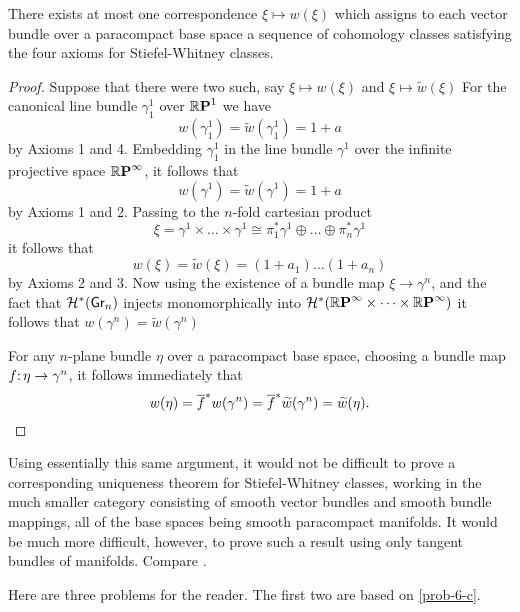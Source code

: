 \begin{theorem}\label{thm-7-3}
	There exists at most one correspondence $\xi \mapsto w(\xi)$ which assigns to each vector bundle over a paracompact base space a sequence of cohomology classes satisfying the four axioms for Stiefel-Whitney classes.
\end{theorem}
\begin{proof}
	Suppose that there were two such, say $\xi \mapsto w(\xi)$ and $\xi \mapsto \widetilde{w}(\xi)$ For the canonical line bundle $\gamma_{1}^{1}$ over $\boldsymbol{\mathbb{R}}\boldsymbol{\mathrm{P}}^{1}$ we have
	\[
	w(\gamma_{1}^{1})=\widetilde{w}(\gamma_{1}^{1})=1+a
	\]
	by Axioms 1 and 4. Embedding $\gamma_{1}^{1}$ in the line bundle $\gamma^{1}$ over the infinite projective space $\boldsymbol{\mathbb{R}}\boldsymbol{\mathrm{P}}^{\infty}$, it follows that
	\[
	w(\gamma^{1})=\widetilde{w}(\gamma^{1})=1+a
	\]
	by Axioms 1 and $2 $. Passing to the $n$-fold cartesian product
	\[
	\xi=\gamma^{1} \times \dots \times \gamma^{1} \cong \pi_{1}^{*} \gamma^{1} \oplus \dots \oplus \pi_{n}^{*} \gamma^{1}
	\]
	it follows that
	\[
	w(\xi)=\widetilde{w}(\xi)=(1+a_{1}) \dots(1+a_{n})
	\]
	by Axioms 2 and 3. Now using the existence of a bundle map $\xi \rightarrow \gamma^{n}$, and the fact that $\homology^{*}(\grass{n}{})$ injects monomorphically into $\mathcal{H}^{*}(\boldsymbol{\mathbb{R}}\boldsymbol{\mathrm{P}}^{\infty} \times \dots \times \boldsymbol{\mathbb{R}}\boldsymbol{\mathrm{P}}^{\infty})$ it follows that $w(\gamma^{n})=\widetilde{w}(\gamma^{n})$
	
	For any $n$-plane bundle $\eta$ over a paracompact base space, choosing a bundle map $\map{f}{\eta}{\gamma^{n}}$, it follows immediately that
	\[
	w(\eta)=\overline{f}^{*} w(\gamma^{n})=\overline{f}^{*} \widetilde{w}(\gamma^{n})=\widetilde{w}(\eta).\qedhere
	\]
\end{proof}
\begin{remark*}
	Using essentially this same argument, it would not be difficult to prove a corresponding uniqueness theorem for Stiefel-Whitney classes, working in the much smaller category consisting of smooth vector bundles and smooth bundle mappings, all of the base spaces being smooth paracompact manifolds. It would be much more difficult, however, to prove such a result using only tangent bundles of manifolds. Compare \cite{78}.
\end{remark*}


Here are three problems for the reader. The first two are based on \cref{prob-6-c}.

